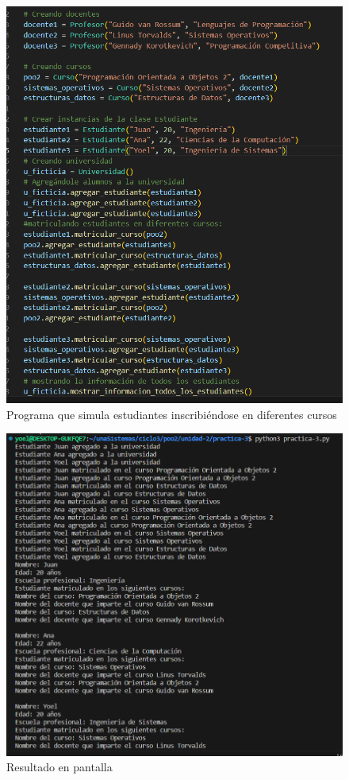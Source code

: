 \documentclass[11pt,a4paper]{article}
\begin{document}
\begin{figure}[H]
    \centering
    \includegraphics[width=1\linewidth]{images/16.png}
    \caption{Programa que simula estudiantes inscribiéndose en diferentes cursos}
    \label{fig:enter-label}
\end{figure}

\begin{figure}[H]
    \centering
    \includegraphics[width=1\linewidth]{images/17.png}
    \caption{Resultado en pantalla}
    \label{fig:enter-label}
\end{figure}
\end{document}
